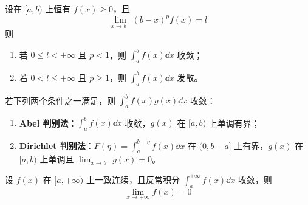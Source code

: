 \begin{proposition}
	设在 $[a,b)$ 上恒有 $f(x) \ge 0$，且
	\[
	\lim_{x \to b^-} (b-x)^p f(x) = l
	\]
	则
	\begin{enumerate}
		\item 若 $0 \le l < +\infty$ 且 $p<1$，则 $\displaystyle \int_a^b f(x)\dd x$ 收敛；
		\item 若 $0 < l \le +\infty$ 且 $p \ge 1$，则 $\displaystyle \int_a^b f(x)\dd x$ 发散。
	\end{enumerate}
	
\end{proposition}
\begin{proposition}
	若下列两个条件之一满足，则 $\displaystyle \int_a^b f(x)g(x)\dd x$ 收敛：
	\begin{enumerate}
		\item \textbf{Abel 判别法}：$\displaystyle \int_a^b f(x)\dd x$ 收敛，$g(x)$ 在 $[a,b)$ 上单调有界；
		\item \textbf{Dirichlet 判别法}：$F(\eta)=\displaystyle \int_a^{b-\eta} f(x)\dd x$ 在 $(0,b-a]$ 上有界，$g(x)$ 在 $[a,b)$ 上单调且 $\lim_{x \to b^-} g(x)=0$。
	\end{enumerate}
\end{proposition}
\begin{proposition}
	设 $f(x)$ 在 $[a,+\infty)$ 上一致连续，且反常积分 $\displaystyle \int_a^{+\infty} f(x)\dd x$ 收敛，则
	\[
	\lim_{x\to+\infty} f(x)=0\]
\end{proposition}
